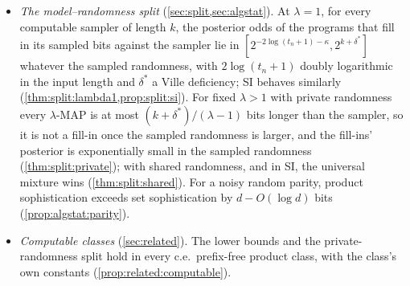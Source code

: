 \begin{itemize}
\item \emph{The model--randomness split} (\cref{sec:split,sec:algstat}). At $\lambda=1$, for every computable sampler of length $k$, the posterior odds of the programs that fill in its sampled bits against the sampler lie in $[2^{-2\log(t_n+1)-\kappa},2^{k+\delta^*}]$ whatever the sampled randomness, with $2\log(t_n+1)$ doubly logarithmic in the input length and $\delta^*$ a Ville deficiency; SI behaves similarly (\cref{thm:split:lambda1,prop:split:si}). For fixed $\lambda>1$ with private randomness every $\lambda$-MAP is at most $(k+\delta^*)/(\lambda-1)$ bits longer than the sampler, so it is not a fill-in once the sampled randomness is larger, and the fill-ins' posterior is exponentially small in the sampled randomness (\cref{thm:split:private}); with shared randomness, and in SI, the universal mixture wins (\cref{thm:split:shared}). For a noisy random parity, product sophistication exceeds set sophistication by $d-O(\log d)$ bits (\cref{prop:algstat:parity}).
\item \emph{Computable classes} (\cref{sec:related}). The lower bounds and the private-randomness split hold in every c.e.\ prefix-free product class, with the class's own constants (\cref{prop:related:computable}).
\end{itemize}

